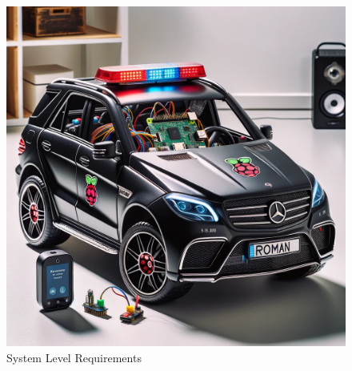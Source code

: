 \documentclass{article}
\begin{document}
	\begin{figure}[h!] %
		\centering %
		\includegraphics[width=1.0\textwidth]{System_View.png} %
		\caption{System Level Requirements}
	\end{figure}
	
	
\end{document}
